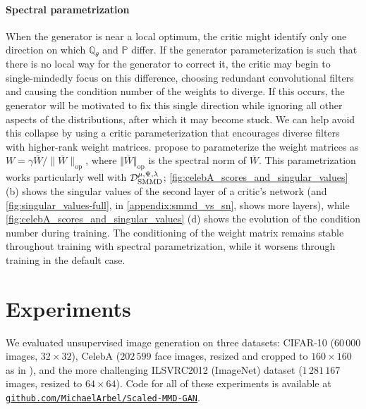 \documentclass{article}
\newcommand{\PP}{\mathbb P}
\newcommand{\QQ}{\mathbb Q}
\newcommand{\httpsurl}[1]{\href{https://#1}{\nolinkurl{#1}}}
\begin{document}
\paragraph{Spectral parametrization}\label{par:parametrization}
When the generator is near a local optimum,
the critic might identify only one direction on which $\QQ_\theta$ and $\PP$ differ.
If the generator parameterization is such that there is no local way for the generator to correct it,
the critic may begin to single-mindedly focus on this difference,
choosing redundant convolutional filters
and causing the condition number of the weights to diverge.
If this occurs, the generator will be motivated to fix this single direction
while ignoring all other aspects of the distributions,
after which it may become stuck.
We can help avoid this collapse by using a critic parameterization
that encourages diverse filters with higher-rank weight matrices.
\Textcite{Miyato:2018} propose to parameterize the weight matrices as
$W = \gamma \bar{W} / \lVert \bar{W} \rVert_\text{op}$,
where $\Vert \bar{W} \Vert_\text{op}$ is the spectral norm of $\bar{W}$.
This parametrization works particularly well with $\optSMMD$;
\cref{fig:celebA_scores_and_singular_values} (b) shows the singular values of the second layer of a critic's network (and \cref{fig:singular_values-full}, in \cref{appendix:smmd_vs_sn}, shows more layers), while \cref{fig:celebA_scores_and_singular_values} (d) shows the evolution of the condition number during training.
The conditioning of the weight matrix remains stable throughout training with spectral parametrization,
while it worsens through training in the default case.











\section{Experiments} \label{sec:experiments}

We evaluated unsupervised image generation on three datasets:
CIFAR-10 \parencite{cifar10} ($60\,000$ images, $32\times32$),
CelebA \parencite{celeba} ($202\,599$ face images, resized and cropped to $160\times160$ as in \cite{Binkowski:2018}),
and the more challenging ILSVRC2012 (ImageNet) dataset \parencite{Russakovsky:2014} ($1\,281\,167$ images, resized to $64\times64$).
Code for all of these experiments is available at
\httpsurl{github.com/MichaelArbel/Scaled-MMD-GAN}.
\end{document}
